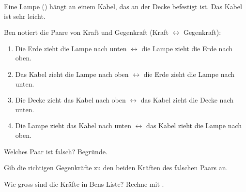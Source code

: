 Eine Lampe (\mLO) hängt an einem Kabel, das an der Decke befestigt ist. Das Kabel ist sehr leicht.

\begin{center}
\end{center}

Ben notiert die Paare von Kraft und Gegenkraft (Kraft $\leftrightarrow$ Gegenkraft):
\begin{enumerate}
\item Die Erde zieht die Lampe nach unten $\leftrightarrow$ die Lampe zieht die Erde nach oben.
\item Das Kabel zieht die Lampe nach oben $\leftrightarrow$ die Erde zieht die Lampe nach unten.
\item Die Decke zieht das Kabel nach oben $\leftrightarrow$ das Kabel zieht die Decke nach unten.
\item Die Lampe zieht das Kabel nach unten $\leftrightarrow$ das Kabel zieht die Lampe nach oben.
\end{enumerate}

\begin{abcliste}
\abc
Welches Paar ist falsch? Begründe.

\abc
Gib die richtigen Gegenkräfte zu den beiden Kräften des falschen Paars an.

\abc
Wie gross sind die Kräfte in Bens Liste? Rechne mit \gO.
\end{abcliste}
